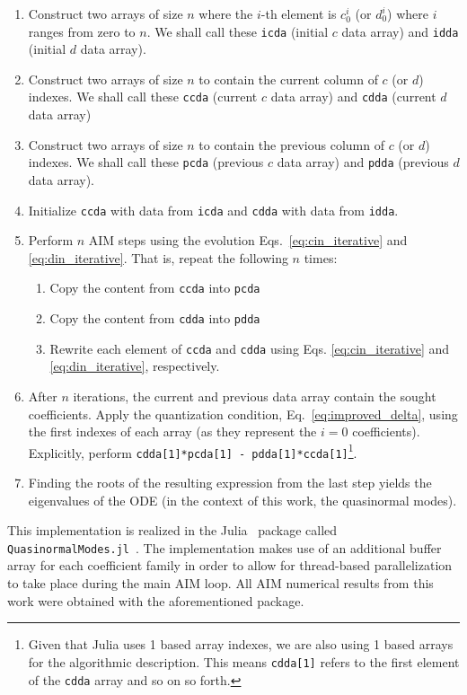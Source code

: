 \begin{enumerate}
  \item Construct two arrays of size $n$ where the $i$-th element is $c^i_0$ (or $d^i_0$) where $i$ ranges from zero to $n$. We shall call these \texttt{icda} (initial $c$ data array) and \texttt{idda} (initial $d$ data array).

  \item Construct two arrays of size $n$ to contain the current column of $c$ (or $d$) indexes. We shall call these \texttt{ccda} (current $c$ data array) and \texttt{cdda} (current $d$ data array)

  \item Construct two arrays of size $n$ to contain the previous column of $c$ (or $d$) indexes. We shall call these \texttt{pcda} (previous $c$ data array) and \texttt{pdda} (previous $d$ data array).

  \item Initialize \texttt{ccda} with data from \texttt{icda} and \texttt{cdda} with data from \texttt{idda}.

  \item Perform $n$ AIM steps using the evolution Eqs.~\eqref{eq:cin_iterative} and \eqref{eq:din_iterative}. That is, repeat the following $n$ times:

        \begin{enumerate}
          \item Copy the content from \texttt{ccda} into \texttt{pcda}
          \item Copy the content from \texttt{cdda} into \texttt{pdda}
          \item Rewrite each element of \texttt{ccda} and \texttt{cdda} using Eqs. \eqref{eq:cin_iterative} and \eqref{eq:din_iterative}, respectively.
        \end{enumerate}

  \item After $n$ iterations, the current and previous data array contain the sought coefficients. Apply the quantization condition, Eq.~\eqref{eq:improved_delta}, using the first indexes of each array (as they represent the $i=0$ coefficients). Explicitly, perform \texttt{cdda[1]*pcda[1] - pdda[1]*ccda[1]}\footnote{Given that Julia uses 1 based array indexes, we are also using 1 based arrays for the algorithmic description. This means \texttt{cdda[1]} refers to the first element of the \texttt{cdda} array and so on so forth.}.

  \item Finding the roots of the resulting expression from the last step yields the eigenvalues of the ODE (in the context of this work, the quasinormal modes).
\end{enumerate}

This implementation is realized in the Julia~\cite{BEZANSON:2017} package called \texttt{QuasinormalModes.jl}~\cite{SANCHES:2021}. The implementation makes use of an additional buffer array for each coefficient family in order to allow for thread-based parallelization to take place during the main AIM loop. All AIM numerical results from this work were obtained with the aforementioned package.